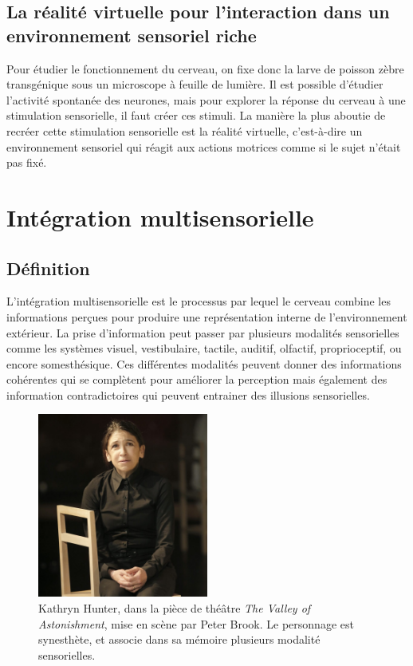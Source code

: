 \subsection{La réalité virtuelle pour l'interaction dans un environnement sensoriel riche }

Pour étudier le fonctionnement du cerveau, on fixe donc la larve de poisson zèbre transgénique sous un microscope à feuille de lumière. Il est possible d'étudier l'activité spontanée des neurones, mais pour explorer la réponse du cerveau à une stimulation sensorielle, il faut créer ces stimuli. La manière la plus aboutie de recréer cette stimulation sensorielle est la réalité virtuelle, c'est-à-dire un environnement sensoriel qui réagit aux actions motrices comme si le sujet n'était pas fixé.


\section{Intégration multisensorielle}

\subsection{Définition}

L'intégration multisensorielle est le processus par lequel le cerveau combine les informations perçues pour produire une représentation interne de l'environnement extérieur. La prise d'information peut passer par plusieurs modalités sensorielles comme les systèmes visuel, vestibulaire, tactile, auditif, olfactif, proprioceptif, ou encore somesthésique. Ces différentes modalités peuvent donner des informations cohérentes qui se complètent pour améliorer la perception mais également des information contradictoires qui peuvent entrainer des illusions sensorielles.

\begin{figure}
\centering
\includegraphics[width=0.5\textwidth]{./files/Kathryn-Hunter_Peter-Brook_valley-of-astonishement.jpg}
\caption{Kathryn Hunter, dans la pièce de théâtre \emph{The Valley of Astonishment}, mise en scène par Peter Brook. Le personnage est synesthète, et associe dans sa mémoire plusieurs modalité sensorielles.}
\end{figure}

